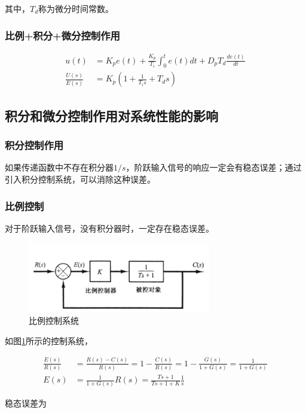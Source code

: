 其中，$T_d$称为微分时间常数。

\subsubsection{比例+积分+微分控制作用}

\begin{align*}
u(t)&=K_pe(t)+\frac{K_p}{T_i}\int_0^te(t)dt+D_pT_d\frac{de(t)}{dt}\\
\frac{U(s)}{E(s)}&=K_p\left(1+\frac{1}{T_is}+T_ds\right)
\end{align*}

\subsection{积分和微分控制作用对系统性能的影响}

\subsubsection{积分控制作用}

如果传递函数中不存在积分器$1/s$，阶跃输入信号的响应一定会有稳态误差；通过引入积分控制系统，可以消除这种误差。

\subsubsection{比例控制}

对于阶跃输入信号，没有积分器时，一定存在稳态误差。

\begin{figure}[!ht]
	\centering
	\includegraphics[width=8cm]{figures/13.png}
	\caption{比例控制系统}
	\label{13}
\end{figure}

如图\ref{13}所示的控制系统，

\begin{align*}
\frac{E(s)}{R(s)}&=\frac{R(s)-C(s)}{R(s)}=1-\frac{C(s)}{R(s)}=1-\frac{G(s)}{1+G(s)}=\frac{1}{1+G(s)}\\
E(s)&=\frac{1}{1+G(s)}R(s)=\frac{Ts+1}{Ts+1+K}\frac1s
\end{align*}

稳态误差为

